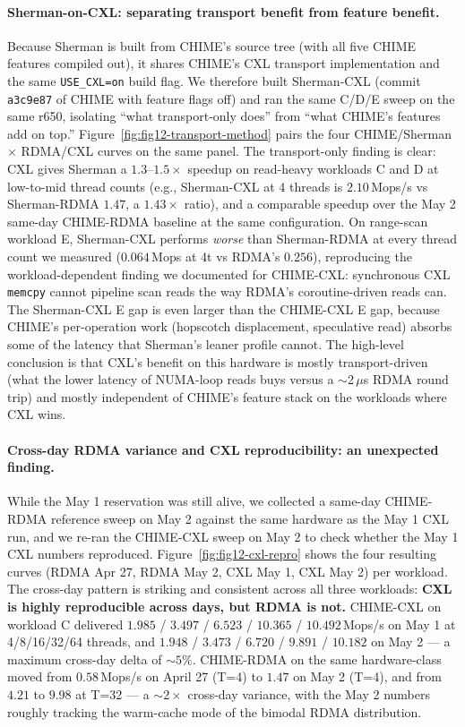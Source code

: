 \documentclass[11pt,a4paper]{article}
\begin{document}
\paragraph{Sherman-on-CXL: separating transport benefit from feature benefit.} Because Sherman is built from CHIME's source tree (with all five CHIME features compiled out), it shares CHIME's CXL transport implementation and the same \texttt{USE\_CXL=on} build flag. We therefore built Sherman-CXL (commit \texttt{a3c9e87} of CHIME with feature flags off) and ran the same C/D/E sweep on the same r650, isolating ``what transport-only does'' from ``what CHIME's features add on top.'' Figure~\ref{fig:fig12-transport-method} pairs the four CHIME/Sherman $\times$ RDMA/CXL curves on the same panel. The transport-only finding is clear: CXL gives Sherman a $1.3$--$1.5\times$ speedup on read-heavy workloads C and D at low-to-mid thread counts (e.g., Sherman-CXL at 4 threads is $2.10$\,Mops/s vs Sherman-RDMA $1.47$, a $1.43\times$ ratio), and a comparable speedup over the May 2 same-day CHIME-RDMA baseline at the same configuration. On range-scan workload E, Sherman-CXL performs \emph{worse} than Sherman-RDMA at every thread count we measured ($0.064$\,Mops at 4t vs RDMA's $0.256$), reproducing the workload-dependent finding we documented for CHIME-CXL: synchronous CXL \texttt{memcpy} cannot pipeline scan reads the way RDMA's coroutine-driven reads can. The Sherman-CXL E gap is even larger than the CHIME-CXL E gap, because CHIME's per-operation work (hopscotch displacement, speculative read) absorbs some of the latency that Sherman's leaner profile cannot. The high-level conclusion is that CXL's benefit on this hardware is mostly transport-driven (what the lower latency of NUMA-loop reads buys versus a $\sim$2\,$\mu$s RDMA round trip) and mostly independent of CHIME's feature stack on the workloads where CXL wins.

\paragraph{Cross-day RDMA variance and CXL reproducibility: an unexpected finding.} While the May 1 reservation was still alive, we collected a same-day CHIME-RDMA reference sweep on May 2 against the same hardware as the May 1 CXL run, and we re-ran the CHIME-CXL sweep on May 2 to check whether the May 1 CXL numbers reproduced. Figure~\ref{fig:fig12-cxl-repro} shows the four resulting curves (RDMA Apr 27, RDMA May 2, CXL May 1, CXL May 2) per workload. The cross-day pattern is striking and consistent across all three workloads: \textbf{CXL is highly reproducible across days, but RDMA is not.} CHIME-CXL on workload C delivered $1.985$ / $3.497$ / $6.523$ / $10.365$ / $10.492$\,Mops/s on May 1 at 4/8/16/32/64 threads, and $1.948$ / $3.473$ / $6.720$ / $9.891$ / $10.182$ on May 2 --- a maximum cross-day delta of $\sim 5\%$. CHIME-RDMA on the same hardware-class moved from $0.58$\,Mops/s on April 27 (T=4) to $1.47$ on May 2 (T=4), and from $4.21$ to $9.98$ at T=32 --- a $\sim 2\times$ cross-day variance, with the May 2 numbers roughly tracking the warm-cache mode of the bimodal RDMA distribution.
\end{document}
